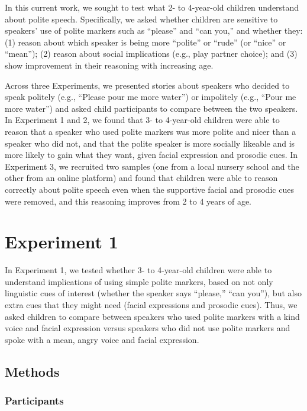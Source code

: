 \documentclass[10pt, letterpaper]{article}
\begin{document}
In this current work, we sought to test what 2- to 4-year-old children
understand about polite speech. Specifically, we asked whether children
are sensitive to speakers' use of polite markers such as ``please'' and
``can you,'' and whether they: (1) reason about which speaker is being
more ``polite'' or ``rude'' (or ``nice'' or ``mean''); (2) reason about
social implications (e.g., play partner choice); and (3) show
improvement in their reasoning with increasing age.

Across three Experiments, we presented stories about speakers who
decided to speak politely (e.g., ``Please pour me more water'') or
impolitely (e.g., ``Pour me more water'') and asked child participants
to compare between the two speakers. In Experiment 1 and 2, we found
that 3- to 4-year-old children were able to reason that a speaker who
used polite markers was more polite and nicer than a speaker who did
not, and that the polite speaker is more socially likeable and is more
likely to gain what they want, given facial expression and prosodic
cues. In Experiment 3, we recruited two samples (one from a local
nursery school and the other from an online platform) and found that
children were able to reason correctly about polite speech even when the
supportive facial and prosodic cues were removed, and this reasoning
improves from 2 to 4 years of age.

\section{Experiment 1}\label{experiment-1}

In Experiment 1, we tested whether 3- to 4-year-old children were able
to understand implications of using simple polite markers, based on not
only linguistic cues of interest (whether the speaker says ``please,''
``can you''), but also extra cues that they might need (facial
expressions and prosodic cues). Thus, we asked children to compare
between speakers who used polite markers with a kind voice and facial
expression versus speakers who did not use polite markers and spoke with
a mean, angry voice and facial expression.

\subsection{Methods}\label{methods}

\subsubsection{Participants}\label{participants}
\end{document}
